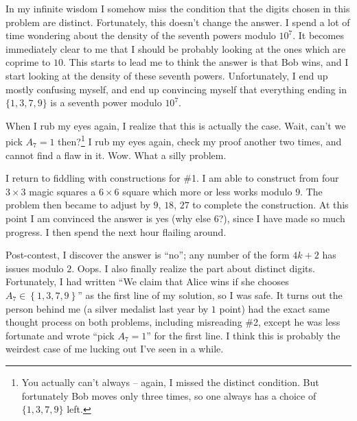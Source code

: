 \documentclass[11pt]{scrreprt}
\begin{document}
In my infinite wisdom I somehow miss the condition that the digits chosen in this problem are distinct.
Fortunately, this doesn't change the answer.
I spend a lot of time wondering about the density of the seventh powers modulo $10^7$.
It becomes immediately clear to me that I should be probably looking at the ones which are coprime to $10$.
This starts to lead me to think the answer is that Bob wins,
and I start looking at the density of these seventh powers.
Unfortunately, I end up mostly confusing myself,
and end up convincing myself that everything ending in $\{1,3,7,9\}$ is a seventh power modulo $10^7$.

When I rub my eyes again, I realize that this is actually the case.
Wait, can't we pick $A_7=1$ then?\footnote{You actually can't always -- again,
I missed the distinct condition.
But fortunately Bob moves only three times,
so one always has a choice of $\{1,3,7,9\}$ left.} I rub my eyes again, check my proof another two times,
and cannot find a flaw in it. Wow. What a silly problem.

I return to fiddling with constructions for \#1.
I am able to construct from four $3 \times 3$ magic squares a $6 \times 6$
square which more or less works modulo $9$.
The problem then became to adjust by $9$, $18$, $27$ to complete the construction.
At this point I am convinced the answer is yes (why else $6$?), since I have made so much progress.
I then spend the next hour flailing around.

Post-contest, I discover the answer is ``no''; any number of the form $4k+2$ has issues modulo $2$.
Oops. I also finally realize the part about distinct digits.
Fortunately, I had written ``We claim that Alice wins if she chooses
$A_7 \in \left\{ 1,3,7,9 \right\}$'' as the first line of my solution, so I was safe.
It turns out the person behind me (a silver medalist last year by $1$ point) had
the exact same thought process on both problems, including misreading \#2,
except he was less fortunate and wrote ``pick $A_7=1$'' for the first line.
I think this is probably the weirdest case of me lucking out I've seen in a while.
\end{document}
